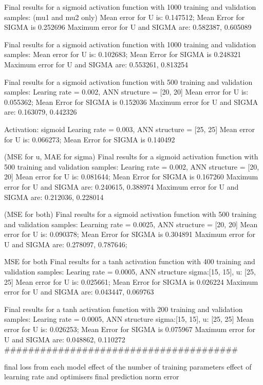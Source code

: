 Final results for a sigmoid activation function with 1000 training and validation samples: (mu1 and mu2 only)
Mean error for U is: 0.147512; Mean Error for SIGMA is 0.252696
Maximum error for U and SIGMA are: 0.582387, 0.605089

Final results for a sigmoid activation function with 1000 training and validation samples: 
Mean error for U is: 0.102683; Mean Error for SIGMA is 0.248321
Maximum error for U and SIGMA are: 0.553261, 0.813254

Final results for a sigmoid activation function with 500 training and validation samples:
Learing rate = 0.002, ANN structure = [20, 20]
Mean error for U is: 0.055362; Mean Error for SIGMA is 0.152036
Maximum error for U and SIGMA are: 0.163079, 0.442326


Activation: sigmoid
Learing rate = 0.003, ANN structure = [25, 25]
Mean error for U is: 0.066273; Mean Error for SIGMA is 0.140492

(MSE for u, MAE for sigma)
Final results for a sigmoid activation function with 500 training and validation samples:
Learing rate = 0.002, ANN structure = [20, 20]
Mean error for U is: 0.081644; Mean Error for SIGMA is 0.167260
Maximum error for U and SIGMA are: 0.240615, 0.388974
Maximum error for U and SIGMA are: 0.212036, 0.228014

(MSE for both)
Final results for a sigmoid activation function with 500 training and validation samples:
Learning rate = 0.0025, ANN structure = [20, 20]
Mean error for U is: 0.090378; Mean Error for SIGMA is 0.304891
Maximum error for U and SIGMA are: 0.278097, 0.787646;

MSE for both
Final results for a tanh activation function with 400 training and validation samples:
Learing rate = 0.0005, ANN structure sigma:[15, 15], u: [25, 25]
Mean error for U is: 0.025661; Mean Error for SIGMA is 0.026224
Maximum error for U and SIGMA are: 0.043447, 0.069763

Final results for a tanh activation function with 200 training and validation samples:
Learing rate = 0.0005, ANN structure sigma:[15, 15], u: [25, 25]
Mean error for U is: 0.026253; Mean Error for SIGMA is 0.075967
Maximum error for U and SIGMA are: 0.048862, 0.110272
\#\#\#\#\#\#\#\#\#\#\#\#\#\#\#\#\#\#\#\#\#\#\#\#\#\#\#\#\#\#\#\#\#\#\#\#\#\#\#


final loss from each model
effect of the number of training parameters
effect of learning rate and optimisers
final prediction norm error